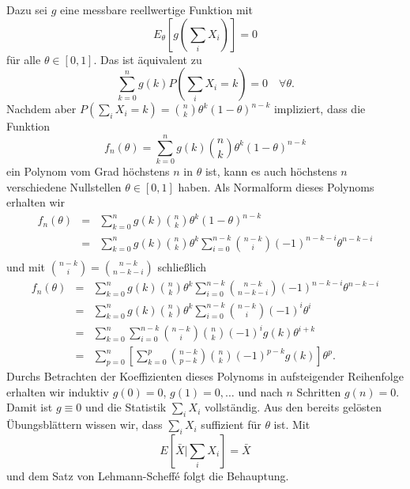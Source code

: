Dazu sei $g$ eine messbare reellwertige Funktion mit
\begin{equation}
	E_\theta \left[ g\left( \sum_{i}^{} X_i \right) \right] = 0 
\end{equation}
für alle $\theta\in \left[ 0,1 \right]$. Das ist äquivalent zu
\begin{equation}
	\sum_{k=0}^{n} g\left( k \right) P\left( \sum_{i}^{}X_i = k \right) = 0 \quad \forall\theta.
\end{equation}
Nachdem aber 
$P\left( \sum_{i}^{} X_i = k \right)= \binom{n}{k}\theta^k \left( 1-\theta \right)^{n-k}$
impliziert, dass die Funktion 
\begin{equation}
	f_n(\theta ) = \sum_{k=0}^{n} g\left( k \right) \binom{n}{k}\theta^k \left( 1-\theta \right)^{n-k}
\end{equation}
ein Polynom vom Grad höchstens $n$ in $\theta$ ist, kann es auch höchstens 
$n$ verschiedene Nullstellen
$\theta\in \left[ 0,1 \right]$ haben. Als Normalform dieses Polynoms erhalten wir
\begin{eqnarray}
	f_n(\theta) 
	&=& \sum_{k=0}^{n} g\left( k \right) \binom{n}{k}\theta^k \left( 1-\theta \right)^{n-k} \\ 
	&=& \sum_{k=0}^{n} g\left( k \right) \binom{n}{k}\theta^k \sum_{i=0}^{n-k}\binom{n-k}{i}(-1)^{n-k-i}\theta^{n-k-i} \\
\end{eqnarray}
und mit $\binom{n-k}{i}=\binom{n-k}{n-k-i}$ schließlich
\begin{eqnarray}
	f_n(\theta) 
	&=& \sum_{k=0}^{n} g\left( k \right) \binom{n}{k}\theta^k \sum_{i=0}^{n-k}\binom{n-k}{n-k-i}(-1)^{n-k-i}\theta^{n-k-i} \\
	&=& \sum_{k=0}^{n} g\left( k \right) \binom{n}{k}\theta^k \sum_{i=0}^{n-k}\binom{n-k}{i}(-1)^i\theta^i \\
	&=& \sum_{k=0}^{n} \sum_{i=0}^{n-k}\binom{n-k}{i} \binom{n}{k} (-1)^i  g\left( k \right)  \theta^{i+k} \\
	&=& \sum_{p=0}^{n} \left[ \sum_{k=0}^{p} \binom{n-k}{p-k}\binom{n}{k}(-1)^{p-k} g(k) \right] \theta^p.
\end{eqnarray}
Durchs Betrachten der Koeffizienten dieses Polynoms in aufsteigender Reihenfolge erhalten wir
induktiv $g(0)=0$, $g(1)=0,\ldots$ und nach $n$ Schritten $g(n)=0$.
Damit ist $g \equiv 0$ und die Statistik $\sum_{i}^{} X_i$
vollständig. Aus den bereits gelösten Übungsblättern wissen wir, dass $\sum_{i}^{} X_i$
suffizient für $\theta$ ist. Mit
\begin{equation}
	E\left[ \bar X | \sum_{i}^{} X_i \right] = \bar X
\end{equation}
und dem Satz von Lehmann-Scheff\'e folgt die Behauptung.





